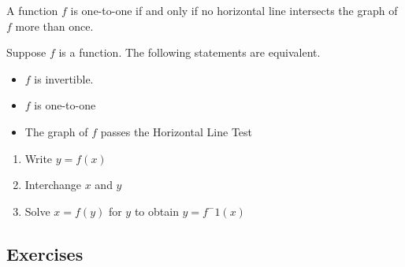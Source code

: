 \begin{theorem}
    A function $f$ is one-to-one if and only if no horizontal line intersects the graph of $f$ more than once.
\end{theorem}

\begin{theorem}
    Suppose $f$ is a function. The following statements are equivalent.
    \begin{itemize}
        \item $f$ is invertible.
        \item $f$ is one-to-one
        \item The graph of $f$ passes the Horizontal Line Test
    \end{itemize}
\end{theorem}

\begin{procedure}
    \begin{enumerate}
        \item Write $y=f(x)$
        \item Interchange $x$ and $y$
        \item Solve $x=f(y)$ for $y$ to obtain $y=f^-1(x)$
    \end{enumerate}
\end{procedure}

\subsection{Exercises}
